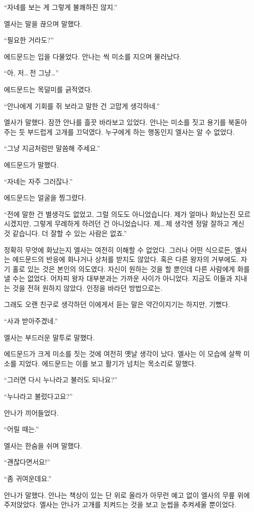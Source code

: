 ``자네를 보는 게 그렇게 불쾌하진 않지.''

엘사는 말을 끊으며 말했다.

``필요한 거라도?''

에드문드는 입을 다물었다. 안나는 씩 미소를 지으며 물러났다.

``아, 저\ldots\,전 그냥\ldots''

에드문드는 목덜미를 긁적였다.

``안나에게 기회를 쥐 보라고 말한 건 고맙게 생각하네.''

엘사가 말했다. 잠깐 안나를 흘끗 바라보고 있었다. 안나는 미소를 짓고 용기를 북돋아 주는 듯 부드럽게 고개를 끄덕였다. 누구에게 하는 행동인지 엘사는 알 수 없었다.

``그냥 지금처럼만 말씀해 주세요.''

에드문드가 말했다.

``자네는 자주 그러잖나.''

에드문드는 얼굴을 찡그렸다.

``전에 말한 건 별생각도 없었고, 그럴 의도도 아니었습니다. 제가 얼마나 화났는진 모르시겠지만, 그렇게 무례하게 하려던 건 아니었습니다. 제\ldots\,제 생각엔 정말 잘하고 계신 것 같습니다. 더 잘할 수 있는 사람은 없죠.''

정확히 무엇에 화났는지 엘사는 여전히 이해할 수 없었다. 그러나 어떤 식으로든, 엘사는 에드문드의 반응에 화나거나 상처를 받지도 않았다. 혹은 다른 왕자의 거부에도. 자기 홀로 있는 것은 본인의 의도였다. 자신이 원하는 것을 할 뿐인데 다른 사람에게 화를 낼 수는 없었다. 어차피 왕자 대부분과는 가까운 사이가 아니었다. 지금도 이들과 지내는 것을 전혀 원하지 않았다. 인정을 바라던 방법으로는.

그래도 오랜 친구로 생각하던 이에게서 듣는 말은 약간이지기는 하지만, 기뻤다.

``사과 받아주겠네.''

엘사는 부드러운 말투로 말했다.

에드문드가 크게 미소를 짓는 것에 여전히 옛날 생각이 났다. 엘사는 이 모습에 살짝 미소를 지었다. 에드문드는 이를 보고 활기가 넘치는 목소리로 말했다.

``그러면 다시 누나라고 불러도 되나요?''

``누나라고 불렀다고요?''

안나가 끼어들었다.

``어릴 때는.''

엘사는 한숨을 쉬며 말했다.

``괜찮다면서요!''

``좀 귀여운데요.''

안나가 말했다. 안나는 책상이 있는 단 위로 올라가 아무런 예고 없이 엘사의 무릎 위에 주저앉았다. 엘사는 안나가 고개를 치켜드는 것을 보고 눈썹을 추켜세울 뿐이었다.

